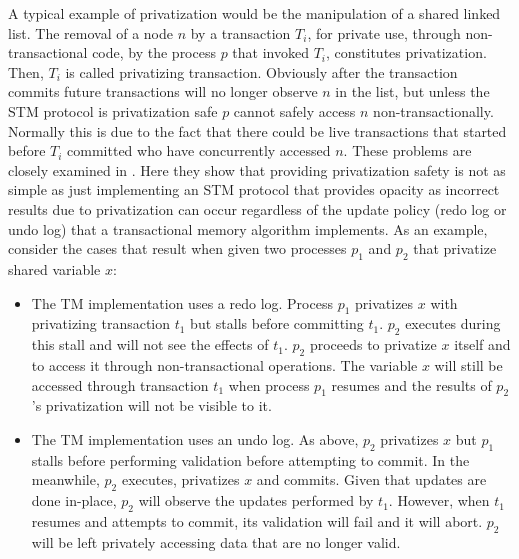 A typical  example of privatization would  be the manipulation  of a shared
linked list. The  removal of a node $n$ by a  transaction $T_i$, for private
use, through  non-transactional  code,  by  the process $p$ that  invoked $T_i$,  
constitutes  privatization. Then, $T_i$  is called privatizing transaction. 
Obviously after the transaction commits future transactions will no longer
observe $n$ in the list, but unless the STM protocol is privatization safe
$p$ cannot safely access $n$ non-transactionally.
Normally this is due to the fact that there could be live transactions
that started before $T_i$ committed who have concurrently accessed $n$.
These problems are closely examined in \cite{spear08}.
Here they show that providing privatization safety is not as
simple as just implementing an STM protocol that provides opacity as incorrect results due to
privatization can occur regardless of the update policy
(redo log or undo log)  that a  transactional memory algorithm implements. 
As  an example, consider
the cases that result when given two processes $p_1$ and   
$p_2$ that privatize shared variable $x$:
\begin{itemize}
\vspace{-0.1cm}
\item  
The TM implementation  uses a  redo log.  Process $p_1$ privatizes  $x$ with
privatizing transaction $t_1$ but stalls before committing $t_1$.  
$p_2$ executes during this stall and will not see the effects of $t_1$. 
$p_2$ proceeds to privatize $x$ itself and to access it through 
non-transactional operations. The variable $x$  will still be accessed through 
transaction $t_1$ when process $p_1$ resumes and the results of $p_2$'s 
privatization will not be visible to it. 
\vspace{-0.2cm}
\item The TM implementation uses an undo log. As above, $p_2$ privatizes 
$x$ but $p_1$ stalls before performing validation before attempting 
to commit. In the meanwhile, $p_2$ executes, privatizes $x$ and commits. 
Given that updates are done in-place, $p_2$ will observe the updates 
performed by $t_1$. However, when $t_1$ resumes and attempts to commit, 
its validation will fail and it will abort. $p_2$ will be left privately 
accessing data that are no longer valid.
\end{itemize}



